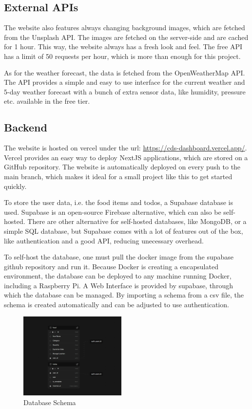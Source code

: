 \subsection{External APIs}
The website also features always changing background images, which are fetched from the Unsplash API. The images are fetched on the server-side and are cached for 1 hour. This way, the website always has a fresh look and feel. The free API has a limit of 50 requests per hour, which is more than enough for this project.

As for the weather forecast, the data is fetched from the OpenWeatherMap API. The API provides a simple and easy to use interface for the current weather and 5-day weather forecast with a bunch of extra sensor data, like humidity, pressure etc. available in the free tier.

\subsection{Backend}
The website is hosted on vercel under the url: \url{https://cds-dashboard.vercel.app/}.
Vercel provides an easy way to deploy NextJS applications, which are stored on a GitHub repository. The website is automatically deployed on every push to the main branch, which makes it ideal for a small project like this to get started quickly.

To store the user data, i.e. the food items and todos, a Supabase database is used. Supabase is an open-source Firebase alternative, which can also be self-hosted. There are other alternative for self-hosted databases, like MongoDB, or a simple SQL database, but Supabase comes with a lot of features out of the box, like authentication and a good API, reducing unecessary overhead.

To self-host the database, one must pull the docker image from the supabase github repository and run it.
Because Docker is creating a encapsulated environment, the database can be deployed to any machine running Docker, including a Raspberry Pi.
A Web Interface is provided by supabase, through which the database can be managed.
By importing a schema from a csv file, the schema is created automatically and can be adjusted to use authentication.

\begin{figure}[H]
    \centering
    \includegraphics[width=0.475\textwidth]{media/database.png}
    \caption{Database Schema}
    \label{fig:schema}
\end{figure}

